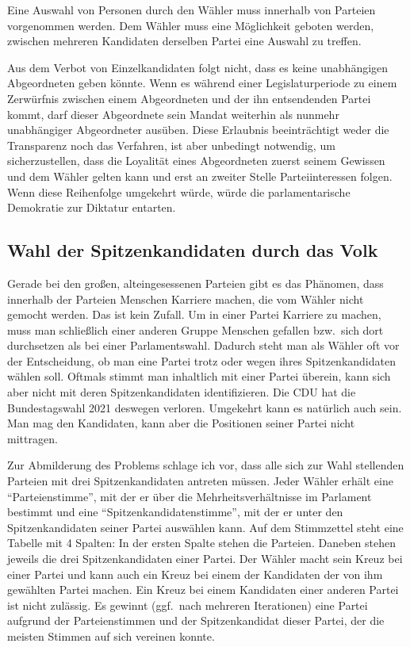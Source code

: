 
Eine Auswahl von Personen durch den Wähler muss innerhalb von Parteien vorgenommen werden. Dem
Wähler muss eine Möglichkeit geboten werden, zwischen mehreren Kandidaten derselben Partei eine
Auswahl zu treffen.


Aus dem Verbot von Einzelkandidaten folgt nicht, dass es keine unabhängigen Abgeordneten geben
könnte. Wenn es während einer Legislaturperiode zu einem Zerwürfnis zwischen einem Abgeordneten
und der ihn entsendenden Partei kommt, darf dieser Abgeordnete sein Mandat weiterhin als nunmehr
unabhängiger Abgeordneter ausüben. Diese Erlaubnis beeinträchtigt weder die Transparenz noch das
Verfahren, ist aber unbedingt notwendig, um sicherzustellen, dass die Loyalität eines Abgeordneten
zuerst seinem Gewissen und dem Wähler gelten kann und erst an zweiter Stelle Parteiinteressen
folgen. Wenn diese Reihenfolge umgekehrt würde, würde die parlamentarische Demokratie zur
Diktatur entarten.

\subsection{Wahl der Spitzenkandidaten durch das Volk}

Gerade bei den großen, alteingesessenen Parteien gibt es das Phänomen, dass innerhalb der
Parteien Menschen Karriere machen, die vom Wähler nicht gemocht werden. Das ist kein Zufall. Um
in einer Partei Karriere zu machen, muss man schließlich einer anderen Gruppe Menschen gefallen
bzw.\ sich dort durchsetzen als bei einer Parlamentswahl. Dadurch steht man als Wähler oft vor
der Entscheidung, ob man eine Partei trotz oder wegen ihres Spitzenkandidaten wählen soll. Oftmals
stimmt man inhaltlich mit einer Partei überein, kann sich aber nicht mit deren
Spitzenkandidaten identifizieren. Die CDU hat die Bundestagswahl 2021 deswegen verloren. Umgekehrt
kann es natürlich auch sein. Man mag den Kandidaten, kann aber die Positionen seiner Partei nicht
mittragen.

Zur Abmilderung des Problems schlage ich vor, dass alle sich zur Wahl stellenden Parteien mit
drei Spitzenkandidaten antreten müssen. Jeder Wähler erhält eine \enquote{Parteienstimme}, mit
der er über die Mehrheitsverhältnisse im Parlament bestimmt und eine
\enquote{Spitzenkandidatenstimme}, mit der er unter den Spitzenkandidaten seiner Partei auswählen
kann. Auf dem Stimmzettel steht eine Tabelle mit 4 Spalten: In der ersten Spalte stehen die
Parteien. Daneben stehen jeweils die drei Spitzenkandidaten einer Partei. Der Wähler macht sein
Kreuz bei einer Partei und kann auch ein Kreuz bei einem der Kandidaten der von ihm gewählten
Partei machen. Ein Kreuz bei einem Kandidaten einer anderen Partei ist nicht zulässig. Es gewinnt
(ggf.\ nach mehreren Iterationen) eine Partei aufgrund der Parteienstimmen und der Spitzenkandidat
dieser Partei, der die meisten Stimmen auf sich vereinen konnte.


